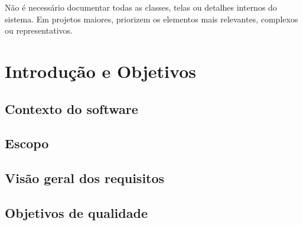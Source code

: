 \documentclass[a4paper,12pt,oneside,openany]{book}
\newif\iforientacoes
\newcommand{\orientacao}[1]{%
    \iforientacoes
        \begin{quote}
        \small\itshape\textbf{Orientação:} #1
        \end{quote}
    \fi
}
\begin{document}
Não é necessário documentar todas as classes, telas ou detalhes internos do
sistema. Em projetos maiores, priorizem os elementos mais relevantes,
complexos ou representativos.

\clearpage
\fi

\chapter{Introdução e Objetivos}

\orientacao{Apresentem brevemente o sistema e expliquem o que será documentado
neste capítulo. O objetivo é permitir que um leitor compreenda o problema e o
escopo antes de examinar as decisões de projeto.}

\section{Contexto do software}

\orientacao{Contextualizem o problema do ponto de vista dos usuários e da
atividade que o software deve apoiar, automatizar ou melhorar. Identifiquem os
principais usuários ou partes interessadas quando isso for relevante.}

\section{Escopo}

\orientacao{Delimitem o que faz parte do sistema e, quando necessário, o que
está explicitamente fora do escopo. Evitem transformar esta seção em uma
especificação detalhada de requisitos.}

\section{Visão geral dos requisitos}

\orientacao{Apresentem os requisitos funcionais e não funcionais mais
importantes para compreender o projeto. Caso a equipe tenha uma especificação
detalhada de requisitos produzida anteriormente, ela pode ser incluída em um
apêndice ou referenciada neste documento.}

\section{Objetivos de qualidade}\label{sec:quality-goals}
\end{document}

